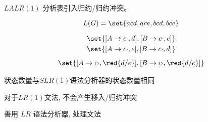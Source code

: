 \begin{frame}{}
  \begin{center}

    \begin{theorem}
      $LALR(1)$ 分析表引入归约/归约冲突。
    \end{theorem}

    \pause
    \[
      L(G) = \set{acd, ace, bcd, bce}
    \]

    \pause
    \vspace{-0.30cm}
    \begin{gather*}
      \set{[A \to c \cdot, d], [B \to c \cdot, e]} \\
      \set{[A \to c \cdot, e], [B \to c \cdot, d]} \\[5pt]
      \set{[A \to c \cdot, \red{d/e}], [B \to c \cdot, \red{d/e}]} \\
    \end{gather*}
  \end{center}
\end{frame}

\begin{frame}{}
  \begin{center}

    \vspace{0.80cm}
    状态数量与$SLR(1)$语法分析器的状态数量相同

    \vspace{0.80cm}
    对于$LR(1)$文法, 不会产生移入/归约冲突
  \end{center}
\end{frame}

\begin{frame}{}
\end{frame}

\begin{frame}{}
  \begin{center}
     善用 $LR$ 语法分析器, 处理文法

  \end{center}
\end{frame}

